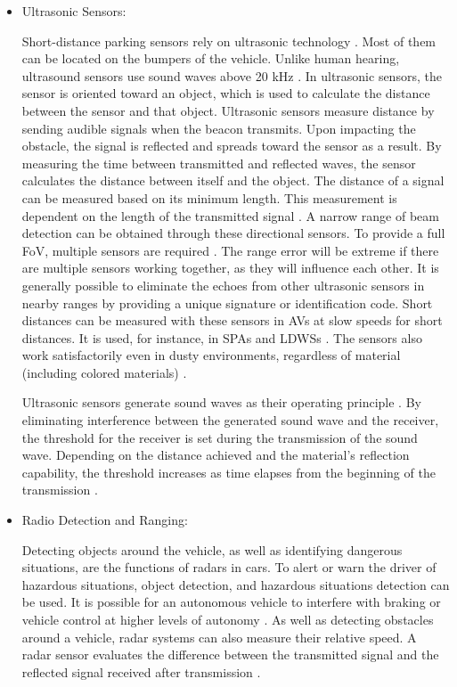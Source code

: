 \documentclass[a4paper,12pt]{article}
\begin{document}
\begin{itemize}
  \item Ultrasonic Sensors:
  
\hspace{5mm} Short-distance parking sensors rely on ultrasonic technology \cite{article26}. Most of them can be located on the bumpers of the vehicle. Unlike human hearing, ultrasound sensors use sound waves above 20 kHz \cite{article26}. In ultrasonic sensors, the sensor is oriented toward an object, which is used to calculate the distance between the sensor and that object. Ultrasonic sensors measure distance by sending audible signals when the beacon transmits. Upon impacting the obstacle, the signal is reflected and spreads toward the sensor as a result. By measuring the time between transmitted and reflected waves, the sensor calculates the distance between itself and the object. The distance of a signal can be measured based on its minimum length. This measurement is dependent on the length of the transmitted signal \cite{article26}. A narrow range of beam detection can be obtained through these directional sensors. To provide a full FoV, multiple sensors are required \cite{article24}. The range error will be extreme if there are multiple sensors working together, as they will influence each other. It is generally possible to eliminate the echoes from other ultrasonic sensors in nearby ranges by providing a unique signature or identification code. Short distances can be measured with these sensors in AVs at slow speeds for short distances. It is used, for instance, in SPAs and LDWSs \cite{article24}. The sensors also work satisfactorily even in dusty environments, regardless of material (including colored materials) \cite{article24}. \par

\hspace{5mm} Ultrasonic sensors generate sound waves as their operating principle \cite{article26}. By eliminating interference between the generated sound wave and the receiver, the threshold for the receiver is set during the transmission of the sound wave. Depending on the distance achieved and the material's reflection capability, the threshold increases as time elapses from the beginning of the transmission \cite{article26}. \par



  \item Radio Detection and Ranging:

  \hspace{5mm} Detecting objects around the vehicle, as well as identifying dangerous situations, are the functions of radars in cars. To alert or warn the driver of hazardous situations, object detection, and hazardous situations detection can be used. It is possible for an autonomous vehicle to interfere with braking or vehicle control at higher levels of autonomy \cite{article26}. As well as detecting obstacles around a vehicle, radar systems can also measure their relative speed. A radar sensor evaluates the difference between the transmitted signal and the reflected signal received after transmission \cite{article26}. 
  

\end{itemize}
\end{document}
